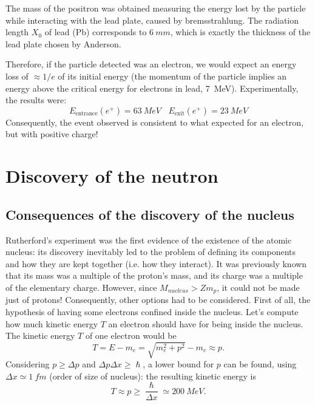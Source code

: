 The mass of the positron was obtained measuring the energy lost by the particle while interacting  with the lead plate, caused by bremsstrahlung.
The radiation length $X_0$ of lead (Pb) corresponds to $6 \ mm$, which is exactly the thickness of the lead plate chosen by Anderson.

Therefore, if the particle detected was an electron, we would expect an energy loss of $\approx 1/e$ of its initial energy (the momentum of the particle implies an energy above the critical energy for electrons in lead, \SI{7}{MeV}). Experimentally, the results were:
\begin{equation*}
    E_\text{entrance}(e^{+}) = 63 \ MeV \ \ \ \
    E_\text{exit}(e^{+}) = 23 \ MeV 
\end{equation*}
Consequently, the event observed is consistent to what expected for an electron, but with positive charge!

\section{Discovery of the neutron}
\subsection{Consequences of the discovery of the nucleus }
Rutherford's experiment was the first evidence of the existence of the atomic nucleus: its discovery inevitably led to the problem of defining its components and how they are kept together (i.e. how they interact).
It was previously known that its mass was a multiple of the proton's mass, and its charge was a multiple of the elementary charge. However, since $M_{nucleus} > Z m_p$, it could not be made just of protons!
Consequently, other options had to be considered. First of all, the hypothesis of having some electrons confined inside the nucleus. Let's compute how much kinetic energy $T$ an electron should have for being inside the nucleus. The kinetic energy $T$ of one electron would be
\begin{equation*}
    T = E - m_e = \sqrt{m_e^2 + p^2}-m_e \approx p.
\end{equation*}
Considering $p \geq \Delta p$ and  $\Delta p \Delta x \geq \hslash$, a lower bound for $p$ can be found, using $\Delta x \simeq 1 \ fm$ (order of size of nucleus): the resulting kinetic energy is
\begin{equation*}
    T \approx p \geq \frac{\hslash}{\Delta x} \simeq \SI{200}{MeV}.
\end{equation*}

